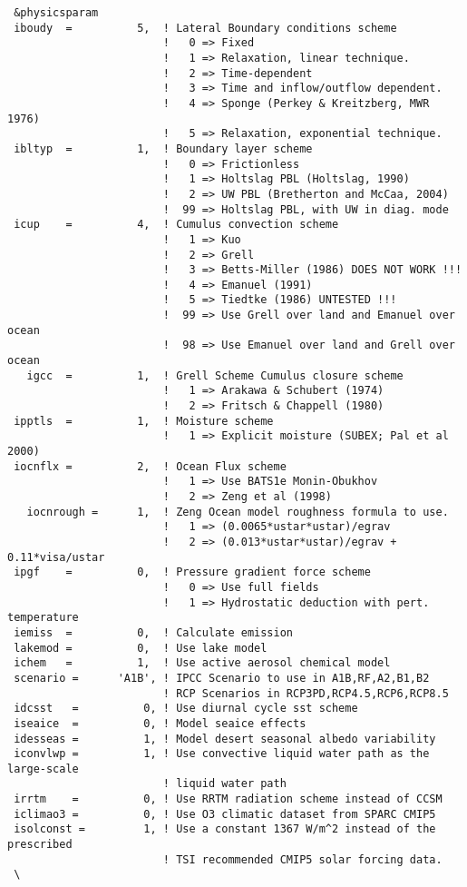 {\footnotesize
\begin{Verbatim}
 &physicsparam
 iboudy  =          5,  ! Lateral Boundary conditions scheme
                        !   0 => Fixed
                        !   1 => Relaxation, linear technique.
                        !   2 => Time-dependent
                        !   3 => Time and inflow/outflow dependent.
                        !   4 => Sponge (Perkey & Kreitzberg, MWR 1976)
                        !   5 => Relaxation, exponential technique.
 ibltyp  =          1,  ! Boundary layer scheme
                        !   0 => Frictionless
                        !   1 => Holtslag PBL (Holtslag, 1990)
                        !   2 => UW PBL (Bretherton and McCaa, 2004)
                        !  99 => Holtslag PBL, with UW in diag. mode
 icup    =          4,  ! Cumulus convection scheme
                        !   1 => Kuo
                        !   2 => Grell
                        !   3 => Betts-Miller (1986) DOES NOT WORK !!!
                        !   4 => Emanuel (1991)
                        !   5 => Tiedtke (1986) UNTESTED !!!
                        !  99 => Use Grell over land and Emanuel over ocean
                        !  98 => Use Emanuel over land and Grell over ocean
   igcc  =          1,  ! Grell Scheme Cumulus closure scheme
                        !   1 => Arakawa & Schubert (1974)
                        !   2 => Fritsch & Chappell (1980)
 ipptls  =          1,  ! Moisture scheme
                        !   1 => Explicit moisture (SUBEX; Pal et al 2000)
 iocnflx =          2,  ! Ocean Flux scheme
                        !   1 => Use BATS1e Monin-Obukhov
                        !   2 => Zeng et al (1998)
   iocnrough =      1,  ! Zeng Ocean model roughness formula to use.
                        !   1 => (0.0065*ustar*ustar)/egrav
                        !   2 => (0.013*ustar*ustar)/egrav + 0.11*visa/ustar
 ipgf    =          0,  ! Pressure gradient force scheme
                        !   0 => Use full fields
                        !   1 => Hydrostatic deduction with pert. temperature
 iemiss  =          0,  ! Calculate emission
 lakemod =          0,  ! Use lake model
 ichem   =          1,  ! Use active aerosol chemical model
 scenario =      'A1B', ! IPCC Scenario to use in A1B,RF,A2,B1,B2
                        ! RCP Scenarios in RCP3PD,RCP4.5,RCP6,RCP8.5
 idcsst   =          0, ! Use diurnal cycle sst scheme
 iseaice  =          0, ! Model seaice effects
 idesseas =          1, ! Model desert seasonal albedo variability
 iconvlwp =          1, ! Use convective liquid water path as the large-scale
                        ! liquid water path
 irrtm    =          0, ! Use RRTM radiation scheme instead of CCSM
 iclimao3 =          0, ! Use O3 climatic dataset from SPARC CMIP5
 isolconst =         1, ! Use a constant 1367 W/m^2 instead of the prescribed
                        ! TSI recommended CMIP5 solar forcing data.
 \
\end{Verbatim}
}

